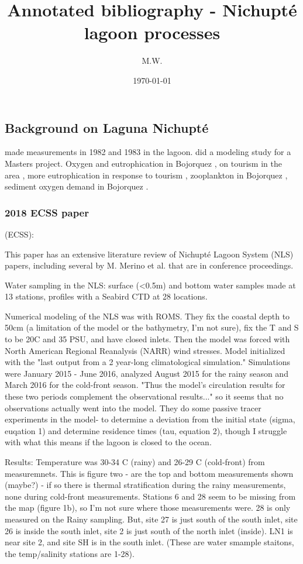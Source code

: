 \documentclass[11pt]{article}
\begin{document}
\title{Annotated bibliography - Nichupt{\'e} lagoon processes}
\author{M.W.}
\date{\today}
\maketitle

\subsection*{Background on Laguna Nichupt{\'e}}

\citet{merino90} made measurements in 1982 and 1983 in the lagoon. \citet{pedrozoacuna08} did a modeling study for a Masters project. Oxygen and eutrophication in Bojorquez \citep{reyes91}, on tourism in the area \citep{torres05}, more eutrophication in response to tourism \citep{merino92}, zooplankton in Bojorquez \citep{alvarezcadena96}, sediment oxygen demand in Bojorquez \citep{valdeslozano06}.

\subsubsection*{2018 ECSS paper}
\citet{romerosierra18} (ECSS): 

This paper has an extensive literature review of Nichupté Lagoon System (NLS) papers, including several by M. Merino et al. that are in conference proceedings. 

Water sampling in the NLS: surface (<0.5m) and bottom water samples made at 13 stations, profiles with a Seabird CTD at 28 locations. 

Numerical modeling of the NLS was with ROMS. They fix the coastal depth to 50cm (a limitation of the model or the bathymetry, I'm not sure), fix the T and S to be 20C and 35 PSU, and have closed inlets. Then the model was forced with North American Regional Reanalysis (NARR) wind stresses. Model initialized with the "last output from a 2 year-long climatological simulation." Simulations were January 2015 - June 2016, analyzed August 2015 for the rainy season and March 2016 for the cold-front season. "Thus the model's circulation results for these two periods complement the observational results..." so it seems that no observations actually went into the model. They do some passive tracer experiments in the model- to determine a deviation from the initial state (sigma, euqation 1) and determine residence times (tau, equation 2), though I struggle with what this means if the lagoon is closed to the ocean. 

Results: Temperature was 30-34 C (rainy) and 26-29 C (cold-front) from measuremnets. This is figure two - are the top and bottom measurements shown (maybe?) - if so there is thermal stratification during the rainy measurements, none during cold-front measurements. Stations 6 and 28 seem to be missing from the map (figure 1b), so I'm not sure where those measurements were. 28 is only measured on the Rainy sampling. But, site 27 is just south of the south inlet, site 26 is inside the south inlet, site 2 is just south of the north inlet (inside). LN1 is near site 2, and site SH is in the south inlet. (These are water smample staitons, the temp/salinity stations are 1-28).
\end{document}
